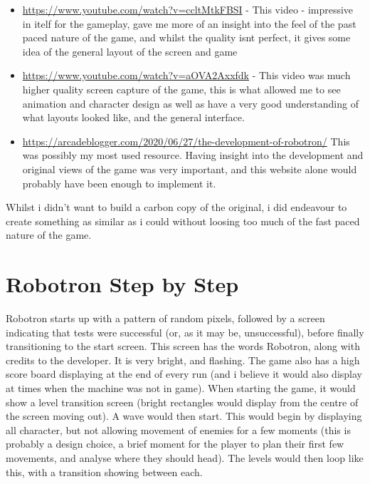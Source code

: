 \begin{itemize}
    \item \url{https://www.youtube.com/watch?v=ccltMtkFBSI} - This video - impressive in itelf for the gameplay, gave me more of an insight into the feel of the past paced nature of the game, and whilst the quality isnt perfect, it gives some idea of the general layout of the screen and game
    
    \item \url{https://www.youtube.com/watch?v=aOVA2Axxfdk} - This video was much higher quality screen capture of the game, this is what allowed me to see animation and character design as well as have a very good understanding of what layouts looked like, and the general interface.
    
    \item \url{https://arcadeblogger.com/2020/06/27/the-development-of-robotron/} This was possibly my most used resource. Having insight into the development and original views of the game was very important, and this website alone would probably have been enough to implement it. 
\end{itemize}

Whilst i didn't want to build a carbon copy of the original, i did endeavour to create something as similar as i could without loosing too much of the fast paced nature of the game.


\section{Robotron Step by Step}
Robotron starts up with a pattern of random pixels, followed by a screen indicating that tests were successful (or, as it may be, unsuccessful), before finally transitioning to the start screen. This screen has the words Robotron, along with credits to the developer. It is very bright, and flashing. The game also has a high score board displaying at the end of every run (and i believe it would also display at times when the machine was not in game). When starting the game, it would show a level transition screen (bright rectangles would display from the centre of the screen moving out). A wave would then start. This would begin by displaying all character, but not allowing movement of enemies for a few moments (this is probably a design choice, a brief moment for the player to plan their first few movements, and analyse where they should head). The levels would then loop like this, with a transition showing between each.


